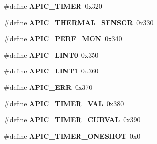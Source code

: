 \begin{DoxyCompactItemize}
\item 
\#define {\bfseries A\+P\+I\+C\+\_\+\+T\+I\+M\+ER}~0x320\hypertarget{group__apic__driver_ga07eb45b15b330a66795b8b266bba5d87}{}\label{group__apic__driver_ga07eb45b15b330a66795b8b266bba5d87}

\item 
\#define {\bfseries A\+P\+I\+C\+\_\+\+T\+H\+E\+R\+M\+A\+L\+\_\+\+S\+E\+N\+S\+OR}~0x330\hypertarget{group__apic__driver_ga0678ddee89d1f8c8d31690bceab429ee}{}\label{group__apic__driver_ga0678ddee89d1f8c8d31690bceab429ee}

\item 
\#define {\bfseries A\+P\+I\+C\+\_\+\+P\+E\+R\+F\+\_\+\+M\+ON}~0x340\hypertarget{group__apic__driver_gacdc82f26a19fb76d7aeb2f052b73dbd1}{}\label{group__apic__driver_gacdc82f26a19fb76d7aeb2f052b73dbd1}

\item 
\#define {\bfseries A\+P\+I\+C\+\_\+\+L\+I\+N\+T0}~0x350\hypertarget{group__apic__driver_gad596035dc51bdd1be8cc58f9997fee1b}{}\label{group__apic__driver_gad596035dc51bdd1be8cc58f9997fee1b}

\item 
\#define {\bfseries A\+P\+I\+C\+\_\+\+L\+I\+N\+T1}~0x360\hypertarget{group__apic__driver_ga5d2bc9834d0163ab18faa52548d04db5}{}\label{group__apic__driver_ga5d2bc9834d0163ab18faa52548d04db5}

\item 
\#define {\bfseries A\+P\+I\+C\+\_\+\+E\+RR}~0x370\hypertarget{group__apic__driver_gac3e1d990079939f117150a34c1ad4f29}{}\label{group__apic__driver_gac3e1d990079939f117150a34c1ad4f29}

\item 
\#define {\bfseries A\+P\+I\+C\+\_\+\+T\+I\+M\+E\+R\+\_\+\+V\+AL}~0x380\hypertarget{group__apic__driver_ga3b37c2f9dce529c8ecc0ca07379dec15}{}\label{group__apic__driver_ga3b37c2f9dce529c8ecc0ca07379dec15}

\item 
\#define {\bfseries A\+P\+I\+C\+\_\+\+T\+I\+M\+E\+R\+\_\+\+C\+U\+R\+V\+AL}~0x390\hypertarget{group__apic__driver_ga323cbdfc2f1283deca236aa039dd76fc}{}\label{group__apic__driver_ga323cbdfc2f1283deca236aa039dd76fc}

\item 
\#define {\bfseries A\+P\+I\+C\+\_\+\+T\+I\+M\+E\+R\+\_\+\+O\+N\+E\+S\+H\+OT}~0x0\hypertarget{group__apic__driver_gac7373c818f218e4599d80a60356f2476}{}\label{group__apic__driver_gac7373c818f218e4599d80a60356f2476}


\end{DoxyCompactItemize}
